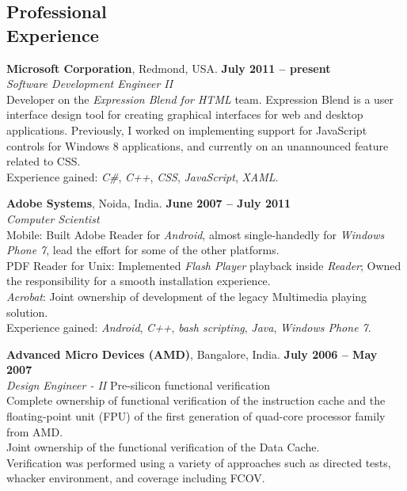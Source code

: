 \documentclass[margin,line]{resume}
\begin{document}
\begin{resume}
	\section{\mysidestyle Professional\\Experience}

	\textbf{Microsoft Corporation}, Redmond, USA. \hfill \textbf{July 2011 -- present}\vspace{2mm}\\\vspace{1mm}%
	\textsl{Software Development Engineer II}\\
	Developer on the \textit{Expression Blend for HTML} team. Expression Blend is a user interface design tool for creating graphical interfaces for web and desktop applications. Previously, I worked on implementing support for JavaScript controls for Windows 8 applications, and currently on an unannounced feature related to CSS.\\
	Experience gained: \textit{C\#}, \textit{C++}, \textit{CSS}, \textit{JavaScript}, \textit{XAML}.

	\textbf{Adobe Systems}, Noida, India. \hfill \textbf{June 2007 -- July 2011}\vspace{2mm}\\\vspace{1mm}%
	\textsl{Computer Scientist}\\
	Mobile: Built Adobe Reader for \textit{Android}, almost single-handedly for \textit{Windows Phone 7}, lead the effort for some of the other platforms.\\
	PDF Reader for Unix: Implemented \textit{Flash Player} playback inside \textit{Reader}; Owned the responsibility for a smooth installation experience.\\
	\textit{Acrobat}: Joint ownership of development of the legacy Multimedia playing solution.\\
	Experience gained: \textit{Android}, \textit{C++}, \textit{bash scripting}, \textit{Java}, \textit{Windows Phone 7}.

	\textbf{Advanced Micro Devices (AMD)}, Bangalore, India. \hfill \textbf{July 2006 -- May 2007}\vspace{2mm}\\\vspace{1mm}%
	\textsl{Design Engineer - II} \hfill Pre-silicon functional verification\\
	Complete ownership of functional verification of the instruction cache and the floating-point unit (FPU) of the first generation of quad-core processor family from AMD.\\
	Joint ownership of the functional verification of the Data Cache.\\
	Verification was performed using a variety of approaches such as directed tests, whacker environment, and coverage including FCOV.


\end{resume}
\end{document}
